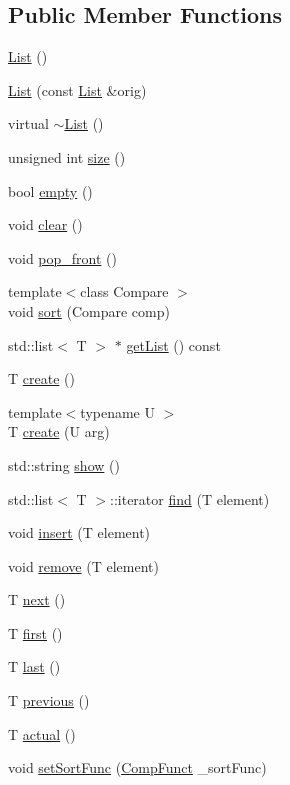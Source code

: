 \subsection*{Public Member Functions}
\begin{DoxyCompactItemize}
\item 
\hyperlink{class_list_a5c5e27671b21b3815d4e25b953c69454}{List} ()
\item 
\hyperlink{class_list_a46e402e625d805b8ccb565129d4d9680}{List} (const \hyperlink{class_list}{List} \&orig)
\item 
virtual \hyperlink{class_list_a2b58189090f6e5ce52939c9195e59e85}{$\sim$\-List} ()
\item 
unsigned int \hyperlink{class_list_ad908ab5cf19370fcdf61cf1927e5e8f5}{size} ()
\item 
bool \hyperlink{class_list_a3737ca60365287ce663393d8c07d1a41}{empty} ()
\item 
void \hyperlink{class_list_ae296516a252e11963dbf963727ce429a}{clear} ()
\item 
void \hyperlink{class_list_a024af4543f71544345351a45850c42d8}{pop\-\_\-front} ()
\item 
{\footnotesize template$<$class Compare $>$ }\\void \hyperlink{class_list_af5bf0ad4812b1a9da9eb20a4646e3e96}{sort} (Compare comp)
\item 
std\-::list$<$ T $>$ $\ast$ \hyperlink{class_list_a570498345450f635b72d1ca2675145cc}{get\-List} () const 
\item 
T \hyperlink{class_list_a3439065c3222c241427e9deb6adf1b01}{create} ()
\item 
{\footnotesize template$<$typename U $>$ }\\T \hyperlink{class_list_a767b6b53a19368f4623d72cea74f9c7b}{create} (U arg)
\item 
std\-::string \hyperlink{class_list_a8f30a708a550bcca33f64dc6fea8affa}{show} ()
\item 
std\-::list$<$ T $>$\-::iterator \hyperlink{class_list_a2f50d3342e016ec57876798ad4e8bf31}{find} (T element)
\item 
void \hyperlink{class_list_a518d00fd77740525522949d4316e8826}{insert} (T element)
\item 
void \hyperlink{class_list_a0ac08f7f3dad900b99e9a73e76d2beee}{remove} (T element)
\item 
T \hyperlink{class_list_a2dce655743c2b6c7cc7c9b6034badf78}{next} ()
\item 
T \hyperlink{class_list_a42761114ff6730da1402089d4bd3f795}{first} ()
\item 
T \hyperlink{class_list_a9944c09ee1bd6390bbf017be5c858063}{last} ()
\item 
T \hyperlink{class_list_ab43f87321c901694807e6c9315a72cd0}{previous} ()
\item 
T \hyperlink{class_list_a58474bac3aa3d1ef7208aa06a3789d57}{actual} ()
\item 
void \hyperlink{class_list_a31a37746c0d960f2f2bb4071b2735c5e}{set\-Sort\-Func} (\hyperlink{class_list_ae43380038701ec3a2fbecaf31f37dd19}{Comp\-Funct} \-\_\-sort\-Func)
\end{DoxyCompactItemize}


